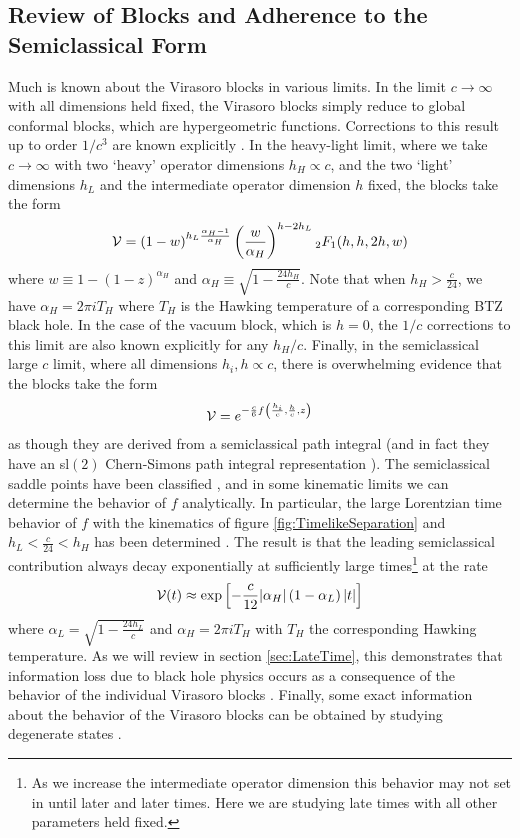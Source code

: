 \documentclass[12pt]{article}
\numberwithin{equation}{section}
\newcommand{\be}{\begin{eqnarray}}
\newcommand{\ee}{\end{eqnarray}}
\newcommand{\CV}{{\cal V}}
\begin{document}
\subsection{Review of Blocks and Adherence to the Semiclassical Form}
\label{sec:AdherencetoSemiclassicalLimit}

Much is known about the Virasoro blocks in various limits.    In the limit $c \to \infty$ with all dimensions held fixed, the Virasoro blocks simply reduce to global conformal blocks, which are hypergeometric functions.  Corrections to this result up to order $1/c^3$ are known explicitly \cite{Chen:2016cms}.  In the heavy-light limit, where we take $c \to \infty$ with two `heavy' operator dimensions $h_H \propto c$, and the two `light' dimensions $h_L$ and the intermediate operator dimension $h$ fixed, the blocks  take the form \cite{Fitzpatrick:2015zha}  
\be \label{eq:HeavyLightBlocks}
\CV = (1-w)^{h_L \frac{\alpha_H - 1}{\alpha_H}} \left( \frac{w}{\alpha_H} \right)^{h-2h_L} {}_2 F_1(h,h,2h, w)
\ee
where $w \equiv 1 - (1-z)^{\alpha_H}$ and $\alpha_H \equiv \sqrt{1 - \frac{24 h_H}{c}}$.  Note that when $h_H > \frac{c}{24}$, we have $\alpha_H = 2 \pi i T_H$ where $T_H$ is the Hawking temperature of a corresponding BTZ black hole.
In the case of the vacuum block, which is $h=0$, the $1/c$ corrections to this limit are also known explicitly \cite{Fitzpatrick:2015dlt} for any $h_H/c$.  Finally, in the semiclassical large $c$ limit, where all dimensions $h_i, h\propto c$, there is overwhelming evidence that the blocks take the form
\be
\label{eq:SemiclassicalLimitofBlocks}
\CV = e^{-\frac{c}{6} f \left( \frac{h_i}{c}, \frac{h}{c}, z \right)} 
\ee
as though they are derived from a semiclassical path integral (and in fact  they have an sl$(2)$ Chern-Simons path integral representation \cite{Fitzpatrick:2016mtp}).  The semiclassical saddle points  have been classified \cite{Fitzpatrick:2016mjq}, and in some kinematic limits we can determine the behavior of $f$ analytically.  In particular, the large Lorentzian time behavior of $f$ with the kinematics of figure \ref{fig:TimelikeSeparation} and  $h_L < \frac{c}{24} < h_H$ has been determined  \cite{Fitzpatrick:2016mjq}.  The result is that the leading semiclassical contribution always decay exponentially at sufficiently large times\footnote{As we increase the intermediate operator dimension this behavior may not set in until later and later times.  Here we are studying late times with all other parameters held fixed.} at the rate 
\be \label{eq:SemiclassicalLateTimeDecay}
\CV(t) \approx \exp \left[ -\frac{c}{12}    | \alpha_H |  \left(1 - \alpha_L \right) |t| \right]
\ee
where $\alpha_L = \sqrt{1 - \frac{24 h_L}{c}}$ and $\alpha_H = 2 \pi i T_H$ with $T_H$ the corresponding Hawking temperature.  As we will review in section \ref{sec:LateTime}, this demonstrates that information loss due to black hole physics \cite{Maldacena:2001kr} occurs as a consequence of the behavior of the individual Virasoro blocks  \cite{Fitzpatrick:2016ive, Fitzpatrick:2016mjq}.  Finally, some exact information about the behavior of the Virasoro blocks can be obtained by studying degenerate states \cite{Fitzpatrick:2016ive}.
\end{document}
